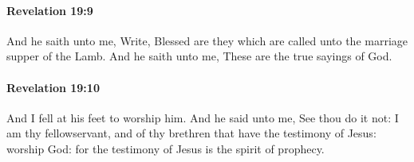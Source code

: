 		\paragraph{Revelation 19:9} %
			\label{REVELATIONNT-19-9}

			And he saith unto me, Write, Blessed are they which are called unto the marriage supper of the Lamb. And he saith unto me, These are the true sayings of God.

			\begin{framed}
			\scriptsize
				\begin{compactdesc}
					\item[SBLG] 
				\end{compactdesc}
			\end{framed}

		\paragraph{Revelation 19:10} %
			\label{REVELATIONNT-19-10}

			And I fell at his feet to worship him. And he said unto me, See thou do it not: I am thy fellowservant, and of thy brethren that have the testimony of Jesus: worship God: for the testimony of Jesus is the spirit of prophecy.

